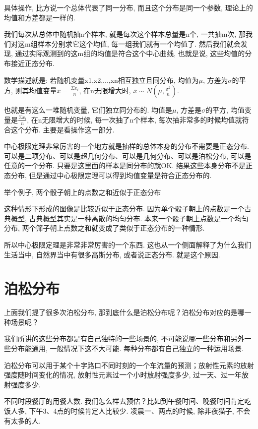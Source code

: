 具体操作, 比方说一个总体代表了同一分布, 而且这个分布是同一个参数, 理论上的均值和方差都是一样的. 

我们每次从总体中随机抽n个样本, 就是每次这个样本总量是n个, 一共抽m次, 那我们对这m组样本分别求它这个均值, 每一组我们就有一个均值了. 然后我们就会发现, 通过实际观测到的这m组的均值是符合这个中心曲线, 也就是说, 这些均值的分布接近正态分布. 

数学描述就是: 若随机变量x1,x2,...,xn相互独立且同分布, 均值为$\mu$, 方差为$\sigma$的平方, 则其均值变量$\bar x = \frac{\Sigma x_i}{n}$, 在n无限增大时, $\bar x\sim N(\mu, \frac{\sigma^2}{n})$.

也就是有这么一堆随机变量, 它们独立同分布的. 均值是$\mu$, 方差是$\sigma$的平方, 均值变量是$\frac{\Sigma x_i}{n}$, 在n无限增大的时候, 每一次抽了n个样本, 每次抽非常多的时候均值就符合这个分布. 主要是看操作这一部分. 

中心极限定理非常厉害的一个地方就是抽样的总体本身的分布不需要是正态分布. 可以是二项分布、可以是超几何分布、可以是几何分布、可以是泊松分布, 可以是任意的一个分布. 只要是这里面的样本是同分布的就OK. 结果这些本身分布不是正态分布, 但是通过中心极限定理可以得到均值变量是符合正态分布的. 

举个例子, 两个骰子朝上的点数之和近似于正态分布

这种情形下形成的图像是比较近似于正态分布. 因为单个骰子朝上的点数是一个古典概型, 古典概型其实是一种离散的均匀分布. 本来一个骰子朝上点数是一个均匀分布, 两个筛子朝上点数之和就变成了类似于正态分布的一种情形. 

所以中心极限定理是非常非常厉害的一个东西. 这也从一个侧面解释了为什么我们生活当中, 自然界当中有很多高斯分布, 或者说正态分布. 就是这个原因. 

\section{泊松分布}

上面我们提了很多次泊松分布, 那到底什么是泊松分布呢？泊松分布对应的是哪一种场景呢？

我们所讲的这些分布都是有自己独特的一些场景的, 不可能说哪一些分布和另外一些分布能通用, 一般情况下这不大可能. 每种分布都有自己独立的一种运用场景. 

泊松分布可以用于某个十字路口不同时刻的一个车流量的预测；放射性元素的放射强度随时间变化的情况, 放射性元素过一个小时放射强度多少, 过一天、过一年放射强度多少. 

不同时段餐厅的用餐人数. 我们怎么样去预估？比如到午餐时间、晚餐时间肯定吃饭人多, 下午3、4点的时候肯定人比较少. 凌晨一、两点的时候, 除非夜猫子, 不会有太多的人. 

